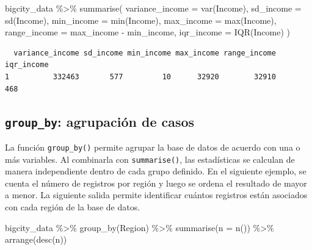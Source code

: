 \documentclass[
  spanish,
  11pt,
  letterpaper,
  oneside,
  open=any]{scrbook}
\newenvironment{Shaded}{\begin{snugshade}}{\end{snugshade}}
\newcommand{\AttributeTok}[1]{\textcolor[rgb]{0.40,0.45,0.13}{#1}}
\newcommand{\FunctionTok}[1]{\textcolor[rgb]{0.28,0.35,0.67}{#1}}
\newcommand{\NormalTok}[1]{\textcolor[rgb]{0.00,0.23,0.31}{#1}}
\newcommand{\SpecialCharTok}[1]{\textcolor[rgb]{0.37,0.37,0.37}{#1}}
\begin{document}
\begin{Shaded}
\begin{Highlighting}[]
\NormalTok{bigcity\_data }\SpecialCharTok{\%\textgreater{}\%}
  \FunctionTok{summarise}\NormalTok{(}
    \AttributeTok{variance\_income =} \FunctionTok{var}\NormalTok{(Income),}
    \AttributeTok{sd\_income =} \FunctionTok{sd}\NormalTok{(Income),}
    \AttributeTok{min\_income =} \FunctionTok{min}\NormalTok{(Income),}
    \AttributeTok{max\_income =} \FunctionTok{max}\NormalTok{(Income),}
    \AttributeTok{range\_income =}\NormalTok{ max\_income }\SpecialCharTok{{-}}\NormalTok{ min\_income,}
    \AttributeTok{iqr\_income =} \FunctionTok{IQR}\NormalTok{(Income)}
\NormalTok{  )}
\end{Highlighting}
\end{Shaded}

\begin{verbatim}
  variance_income sd_income min_income max_income range_income iqr_income
1          332463       577         10      32920        32910        468
\end{verbatim}

\subsection{\texorpdfstring{\texttt{group\_by}: agrupación de
casos}{group\_by: agrupación de casos}}\label{group-by-agrupacion-de-casos}

La función \texttt{group\_by()} permite agrupar la base de datos de
acuerdo con una o más variables. Al combinarla con \texttt{summarise()},
las estadísticas se calculan de manera independiente dentro de cada
grupo definido. En el siguiente ejemplo, se cuenta el número de
registros por región y luego se ordena el resultado de mayor a menor. La
siguiente salida permite identificar cuántos registros están asociados
con cada región de la base de datos.

\begin{Shaded}
\begin{Highlighting}[]
\NormalTok{bigcity\_data }\SpecialCharTok{\%\textgreater{}\%}
  \FunctionTok{group\_by}\NormalTok{(Region) }\SpecialCharTok{\%\textgreater{}\%}
  \FunctionTok{summarise}\NormalTok{(}\AttributeTok{n =} \FunctionTok{n}\NormalTok{()) }\SpecialCharTok{\%\textgreater{}\%}
  \FunctionTok{arrange}\NormalTok{(}\FunctionTok{desc}\NormalTok{(n))}
\end{Highlighting}
\end{Shaded}
\end{document}

